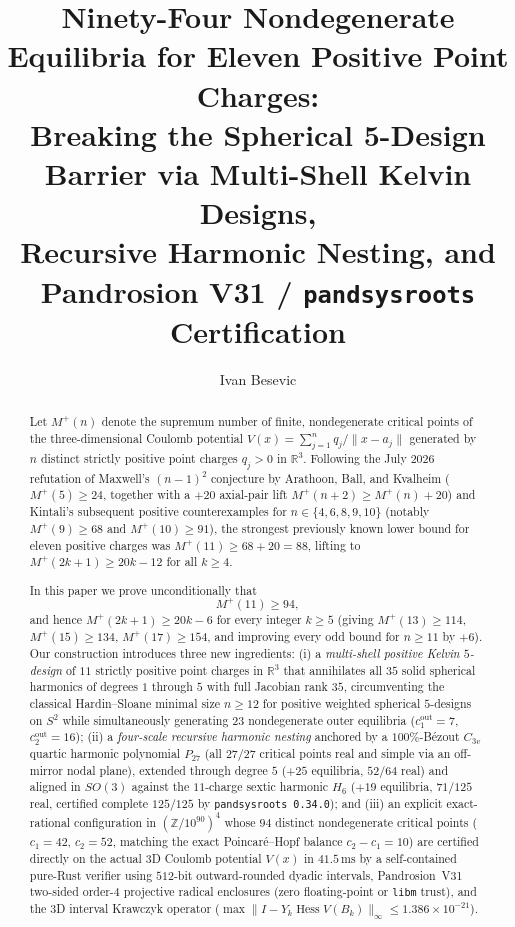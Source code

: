 \documentclass[11pt,a4paper]{amsart}
\title[Ninety-Four Positive Electrostatic Equilibria for Eleven Charges]{%
  Ninety-Four Nondegenerate Equilibria for Eleven Positive Point Charges:\\
  Breaking the Spherical 5-Design Barrier via Multi-Shell Kelvin Designs,\\
  Recursive Harmonic Nesting, and Pandrosion V31 / \texttt{pandsysroots} Certification}
\author{Ivan Besevic}
\theoremstyle{definition}
\newcommand{\R}{\mathbb{R}}
\newcommand{\Z}{\mathbb{Z}}
\DeclareMathOperator{\Hess}{Hess}
\begin{document}
\begin{abstract}
Let $M^+(n)$ denote the supremum number of finite, nondegenerate critical points
of the three-dimensional Coulomb potential
$V(x) = \sum_{j=1}^n q_j / \|x - a_j\|$ generated by $n$ distinct strictly
positive point charges $q_j > 0$ in $\R^3$. Following the July 2026 refutation
of Maxwell's $(n-1)^2$ conjecture by Arathoon, Ball, and Kvalheim
($M^+(5) \ge 24$, together with a $+20$ axial-pair lift $M^+(n+2) \ge M^+(n)+20$)
and Kintali's subsequent positive counterexamples for $n \in \{4,6,8,9,10\}$
(notably $M^+(9) \ge 68$ and $M^+(10) \ge 91$), the strongest previously known
lower bound for eleven positive charges was $M^+(11) \ge 68 + 20 = 88$,
lifting to $M^+(2k+1) \ge 20k - 12$ for all $k \ge 4$.

In this paper we prove unconditionally that
\[
  M^+(11) \ge 94,
\]
and hence $M^+(2k+1) \ge 20k - 6$ for every integer $k \ge 5$ (giving
$M^+(13) \ge 114$, $M^+(15) \ge 134$, $M^+(17) \ge 154$, and improving every
odd bound for $n \ge 11$ by $+6$). Our construction introduces three new
ingredients:
(i) a \emph{multi-shell positive Kelvin $5$-design} of $11$ strictly positive
point charges in $\R^3$ that annihilates all $35$ solid spherical harmonics of
degrees $1$ through $5$ with full Jacobian rank $35$, circumventing the
classical Hardin--Sloane minimal size $n \ge 12$ for positive weighted spherical
$5$-designs on $S^2$ while simultaneously generating $23$ nondegenerate outer
equilibria ($c_1^{\mathrm{out}} = 7$, $c_2^{\mathrm{out}} = 16$);
(ii) a \emph{four-scale recursive harmonic nesting} anchored by a
$100\%$-B\'ezout $C_{3v}$ quartic harmonic polynomial $P_{27}$ (all $27/27$
critical points real and simple via an off-mirror nodal plane), extended
through degree $5$ ($+25$ equilibria, $52/64$ real) and aligned in $SO(3)$
against the $11$-charge sextic harmonic $H_6$ ($+19$ equilibria, $71/125$ real,
certified complete $125/125$ by \texttt{pandsysroots~0.34.0}); and
(iii) an explicit exact-rational configuration in $(\Z / 10^{90})^4$ whose
$94$ distinct nondegenerate critical points ($c_1 = 42$, $c_2 = 52$, matching
the exact Poincar\'e--Hopf balance $c_2 - c_1 = 10$) are certified directly
on the actual 3D Coulomb potential $V(x)$ in $41.5\,\mathrm{ms}$ by a
self-contained pure-Rust verifier using $512$-bit outward-rounded dyadic
intervals, Pandrosion~V31 two-sided order-$4$ projective radical enclosures
(zero floating-point or \texttt{libm} trust), and the 3D interval Krawczyk
operator ($\max \|I - Y_k \Hess V(B_k)\|_\infty \le 1.386 \times 10^{-21}$).
\end{abstract}
\end{document}
